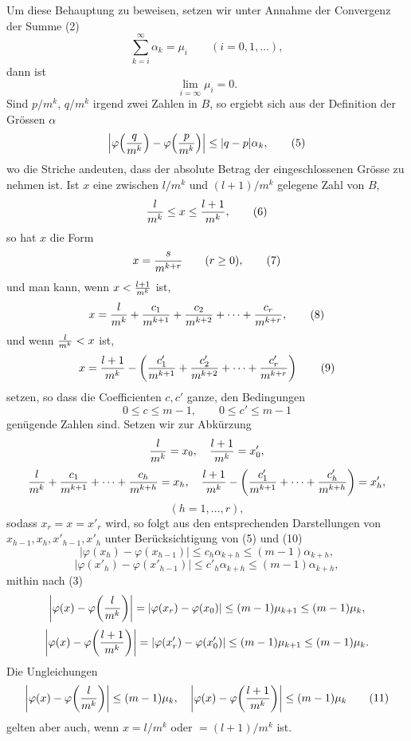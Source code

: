 \documentclass[11pt,a4paper]{article}
\begin{document}
Um diese Behauptung zu beweisen, setzen wir unter Annahme der Convergenz der Summe (2)
\begin{equation}
 \sum_{k=i}^{\infty}\alpha_k=\mu_i\qquad (i=0,1,\ldots),
\tag{3}
\end{equation}
dann ist
\begin{equation}
 \lim_{i=\infty}\mu_i=0.
\tag{4}
\end{equation}
Sind $p/m^k$, $q/m^k$ irgend zwei Zahlen in $B$, so ergiebt sich aus der Definition der Grössen $\alpha$
\begin{equation}
 \left|\varphi\!\left({q\over m^k}\right)-\varphi\!\left({p\over m^k}\right)\right|\le |q-p|\alpha_k,
\tag{5}
\end{equation}
wo die Striche andeuten, dass der absolute Betrag der eingeschlossenen Grösse zu nehmen ist. Ist $x$ eine zwischen $l/m^k$ und $(l+1)/m^k$ gelegene Zahl von $B$,
\begin{equation}
 {l\over m^k}\le x\le {l+1\over m^k},
\tag{6}
\end{equation}
so hat $x$ die Form
\begin{equation}
 x={s\over m^{k+r}}\qquad (r\ge0),
\tag{7}
\end{equation}
und man kann, wenn $x<{l+1\over m^k}$ ist,
\begin{equation}
 x={l\over m^k}+{c_1\over m^{k+1}}+{c_2\over m^{k+2}}+\cdots+{c_r\over m^{k+r}},
\tag{8}
\end{equation}
und wenn ${l\over m^k}<x$ ist,
\begin{equation}
 x={l+1\over m^k}-\left({c'_1\over m^{k+1}}+{c'_2\over m^{k+2}}+\cdots+{c'_r\over m^{k+r}}\right)
\tag{9}
\end{equation}
setzen, so dass die Coefficienten $c,c'$ ganze, den Bedingungen
\begin{equation}
 0\le c\le m-1,
 \qquad
 0\le c'\le m-1
\tag{10}
\end{equation}
genügende Zahlen sind. Setzen wir zur Abkürzung
\[
 {l\over m^k}=x_0,
 \quad
 {l+1\over m^k}=x'_0,
\]
\[
 {l\over m^k}+{c_1\over m^{k+1}}+\cdots+{c_h\over m^{k+h}}=x_h,
 \quad
 {l+1\over m^k}-\left({c'_1\over m^{k+1}}+\cdots+{c'_h\over m^{k+h}}\right)=x'_h,
\]
\[
 (h=1,\ldots,r),
\]
sodass $x_r=x=x'_r$ wird, so folgt aus den entsprechenden Darstellungen von $x_{h-1},x_h,x'_{h-1},x'_h$ unter Berücksichtigung von (5) und (10)
\[
 \left|\varphi(x_h)-\varphi(x_{h-1})\right|\le c_h\alpha_{k+h}\le(m-1)\alpha_{k+h},
\]
\[
 \left|\varphi(x'_h)-\varphi(x'_{h-1})\right|\le c'_h\alpha_{k+h}\le(m-1)\alpha_{k+h},
\]
mithin nach (3)
\[
 \left|\varphi(x)-\varphi\!\left({l\over m^k}\right)\right|=|\varphi(x_r)-\varphi(x_0)|\le(m-1)\mu_{k+1}\le(m-1)\mu_k,
\]
\[
 \left|\varphi(x)-\varphi\!\left({l+1\over m^k}\right)\right|=|\varphi(x'_r)-\varphi(x'_0)|\le(m-1)\mu_{k+1}\le(m-1)\mu_k.
\]
Die Ungleichungen
\begin{equation}
 \left|\varphi(x)-\varphi\!\left({l\over m^k}\right)\right|\le(m-1)\mu_k,
 \quad
 \left|\varphi(x)-\varphi\!\left({l+1\over m^k}\right)\right|\le(m-1)\mu_k
\tag{11}
\end{equation}
gelten aber auch, wenn $x=l/m^k$ oder $=(l+1)/m^k$ ist.
\end{document}
